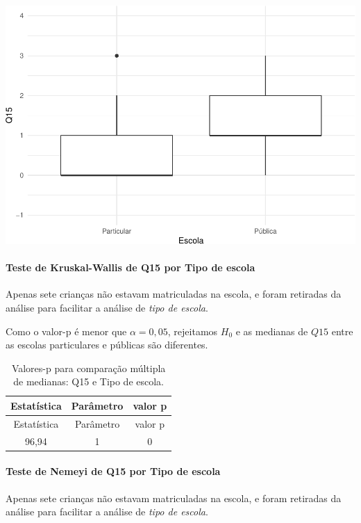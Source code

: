 \documentclass[]{article}
\let\oldparagraph\paragraph
\renewcommand{\paragraph}[1]{\oldparagraph{#1}\mbox{}}
\begin{document}
\begin{center}\includegraphics[width=0.75\linewidth]{relatorio_files/figure-latex/unnamed-chunk-130-1} \end{center}

\hypertarget{teste-de-kruskal-wallis-de-q15-por-tipo-de-escola}{%
\paragraph{Teste de Kruskal-Wallis de Q15 por Tipo de escola}\label{teste-de-kruskal-wallis-de-q15-por-tipo-de-escola}}

Apenas sete crianças não estavam matriculadas na escola, e foram retiradas da análise para facilitar a análise de \emph{tipo de escola}.

Como o valor-p é menor que \(\alpha=0,05\), rejeitamos \(H_0\) e as medianas de \(Q15\) entre as escolas particulares e públicas são diferentes.

\begin{longtable}[]{@{}ccc@{}}
\caption{\label{tab:unnamed-chunk-131}Valores-p para comparação múltipla de medianas: Q15 e Tipo de escola.}\tabularnewline
\toprule
Estatística & Parâmetro & valor p\tabularnewline
\midrule
\endfirsthead
\toprule
Estatística & Parâmetro & valor p\tabularnewline
\midrule
\endhead
96,94 & 1 & 0\tabularnewline
\bottomrule
\end{longtable}

\hypertarget{teste-de-nemeyi-de-q15-por-tipo-de-escola}{%
\paragraph{Teste de Nemeyi de Q15 por Tipo de escola}\label{teste-de-nemeyi-de-q15-por-tipo-de-escola}}

Apenas sete crianças não estavam matriculadas na escola, e foram retiradas da análise para facilitar a análise de \emph{tipo de escola}.
\end{document}
